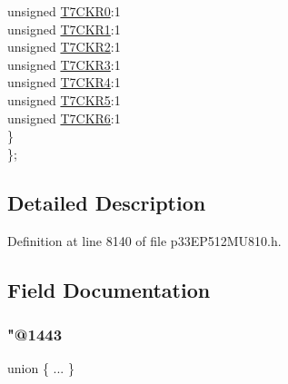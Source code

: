 \begin{DoxyCompactItemize}
\begin{tabbing}
\>\>unsigned \hyperlink{structtag_r_p_i_n_r5_b_i_t_s_a5da880c3c639a31fcfdf3c3554e11a52}{T7CKR0}:1\\
\>\>unsigned \hyperlink{structtag_r_p_i_n_r5_b_i_t_s_a676ca5a9b73786f672f5c5b992b0fcd6}{T7CKR1}:1\\
\>\>unsigned \hyperlink{structtag_r_p_i_n_r5_b_i_t_s_ae867d69bcaeefa48ba99605c11afb9a3}{T7CKR2}:1\\
\>\>unsigned \hyperlink{structtag_r_p_i_n_r5_b_i_t_s_a2b670e36a1540409a945d92050614d3a}{T7CKR3}:1\\
\>\>unsigned \hyperlink{structtag_r_p_i_n_r5_b_i_t_s_aed5203068daeb92bb868b47b1d30d801}{T7CKR4}:1\\
\>\>unsigned \hyperlink{structtag_r_p_i_n_r5_b_i_t_s_afff0ea8c0131d68f7d41a791dd10c95e}{T7CKR5}:1\\
\>\>unsigned \hyperlink{structtag_r_p_i_n_r5_b_i_t_s_a5cc7bb7e1f7dd7fa365edf23854edcee}{T7CKR6}:1\\
\>\} \\
\}; \\

\end{tabbing}\end{DoxyCompactItemize}


\subsection{Detailed Description}


Definition at line 8140 of file p33\+E\+P512\+M\+U810.\+h.



\subsection{Field Documentation}
\mbox{\label{structtag_r_p_i_n_r5_b_i_t_s_a945d29292a91bea3f2c201eee56d1b39}} 
\subsubsection{\texorpdfstring{"@1443}{@1443}}
{\footnotesize\ttfamily union \{ ... \} }

\mbox{\label{structtag_r_p_i_n_r5_b_i_t_s_adf71f3d8410c1f1dbbc96680a92c49af}} 

